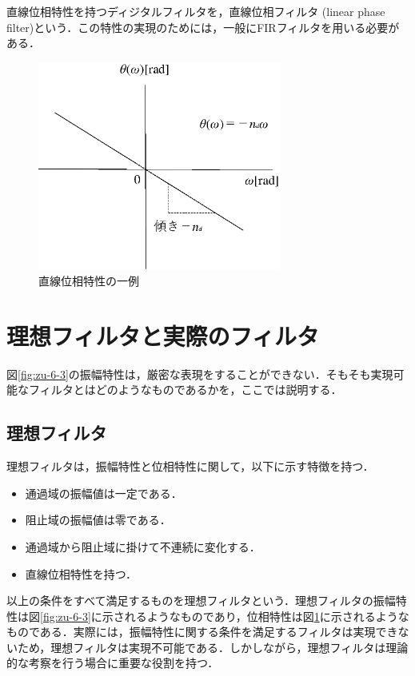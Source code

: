 直線位相特性を持つディジタルフィルタを，直線位相フィルタ (linear phase filter)という．この特性の実現のためには，一般にFIRフィルタを用いる必要がある．

\begin{figure}[H]
\begin{center}
\includegraphics[width=8cm]{fig/zu-6-4.eps}
\end{center}
\caption{直線位相特性の一例}
\label{fig:zu-6-4}
\end{figure}

\section{理想フィルタと実際のフィルタ}

図\ref{fig:zu-6-3}の振幅特性は，厳密な表現をすることができない．そもそも実現可能なフィルタとはどのようなものであるかを，ここでは説明する．

\subsection{理想フィルタ}

理想フィルタは，振幅特性と位相特性に関して，以下に示す特徴を持つ．
\begin{itemize}
\item 通過域の振幅値は一定である．
\item 阻止域の振幅値は零である．
\item 通過域から阻止域に掛けて不連続に変化する．
\item 直線位相特性を持つ．
\end{itemize}
以上の条件をすべて満足するものを理想フィルタという．理想フィルタの振幅特性は図\ref{fig:zu-6-3}に示されるようなものであり，位相特性は図\ref{fig:zu-6-4}に示されるようなものである．実際には，振幅特性に関する条件を満足するフィルタは実現できないため，理想フィルタは実現不可能である．しかしながら，理想フィルタは理論的な考察を行う場合に重要な役割を持つ．

